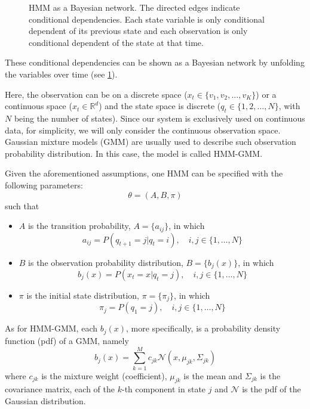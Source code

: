 \documentclass[12pt,final,twoside]{report}
\theoremstyle{plain}
\theoremstyle{definition}
\theoremstyle{remark}
\newcommand{\includetexfig}[1]{}
\begin{document}
\begin{figure}[t]
  \centering
  \includetexfig{hmm}
  \caption[HMM as a Bayesian network.]{HMM as a Bayesian network. The directed edges indicate conditional dependencies. Each state variable is only conditional dependent of its previous state and each observation is only conditional dependent of the state at that time.}
  \label{fig:hmm}
\end{figure}

These conditional dependencies can be shown as a Bayesian network by unfolding the variables over time (see \cref{fig:hmm}).

Here, the observation can be on a discrete space ($x_t \in \{v_1, v_2, \dots, v_K\}$) or a continuous space ($x_t \in \mathbb{R}^d$) and the state space is discrete ($q_t \in \{1, 2, \dots, N\}$, with $N$ being the number of states). Since our system is exclusively used on continuous data, for simplicity, we will only consider the continuous observation space. Gaussian mixture models (GMM) are usually used to describe such observation probability distribution. In this case, the model is called HMM-GMM.

Given the aforementioned assumptions, one HMM can be specified with the following parameters:
\[ \theta = (A, B, \pi) \]
such that
\begin{itemize}
  \item $A$ is the transition probability, $A = \{a_{ij}\}$, in which 
    \[ a_{ij} = P(q_{t+1} = j | q_t = i), \quad i,j \in \{1, \dots, N\} \]
  \item $B$ is the observation probability distribution, $B = \{b_j(x)\}$, in which
    \[ b_j(x) = P(x_t = x | q_t = j), \quad i,j \in \{1, \dots, N\} \]
  \item $\pi$ is the initial state distribution, $\pi = \{\pi_j\}$, in which
    \[ \pi_j = P(q_1 = j), \quad i,j \in \{1, \dots, N\} \]
\end{itemize}

As for HMM-GMM, each $b_j(x)$, more specifically, is a probability density function (pdf) of a GMM, namely
\[ b_j(x) = \sum_{k=1}^M c_{jk} \mathcal{N}(x, \mu_{jk}, \Sigma_{jk}) \]
where $c_{jk}$ is the mixture weight (coefficient), $\mu_{jk}$ is the mean and $\Sigma_{jk}$ is the covariance matrix, each of the $k$-th component in state $j$ and $\mathcal{N}$ is the pdf of the Gaussian distribution. 
\end{document}
